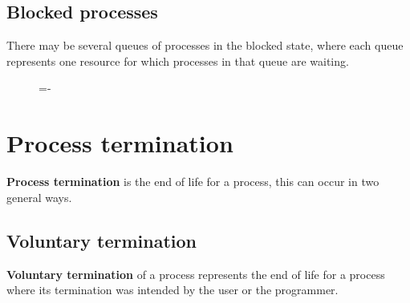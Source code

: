 \documentclass[a4paper]{systems-software}
\begin{document}
\subsection*{Blocked processes}

There may be several queues of processes in the blocked state, where each queue represents one resource for which processes in that queue are waiting.

\begin{figure}[H]
  \lineskip=-\fboxrule
\end{figure}


\section*{Process termination}

\textbf{Process termination} is the end of life for a process, this can occur in two general ways.


\subsection*{Voluntary termination}

\textbf{Voluntary termination} of a process represents the end of life for a process where its termination was intended by the user or the programmer.
\end{document}
